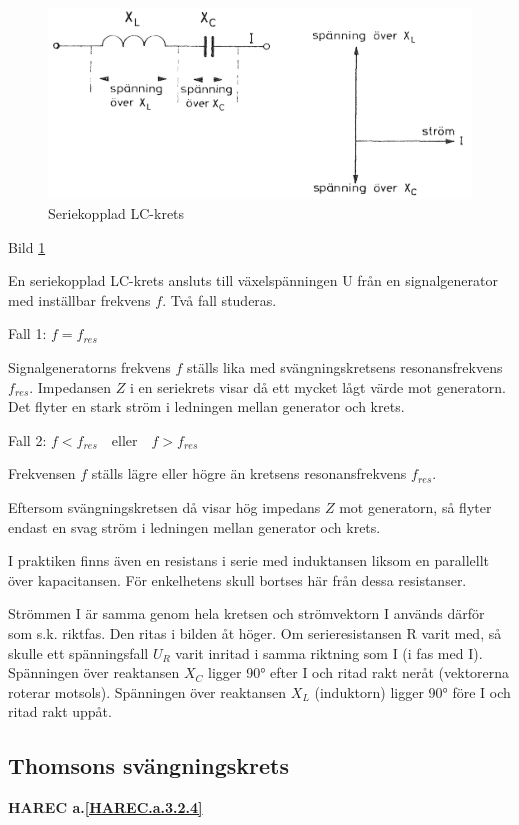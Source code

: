 \begin{figure}
\includegraphics[width=\textwidth]{images/bild_2_3-16.png}
\caption{Seriekopplad LC-krets}
\label{fig:BildII3-16}
\end{figure}

Bild \ref{fig:BildII3-16}

En seriekopplad LC-krets ansluts till växelspänningen U från en signalgenerator
med inställbar frekvens \(f\). Två fall studeras.

Fall 1: \(f = f_{res}\)

Signalgeneratorns frekvens \(f\) ställs lika med svängningskretsens
resonansfrekvens \(f_{res}\). Impedansen \(Z\) i en seriekrets visar då ett
mycket lågt värde mot generatorn. Det flyter en stark ström i ledningen mellan
generator och krets.

Fall 2: \(f < f_{res} \quad \text{eller} \quad f > f_{res}\)

Frekvensen \(f\) ställs lägre eller högre än kretsens resonansfrekvens
\(f_{res}\).

Eftersom svängningskretsen då visar hög impedans \(Z\) mot generatorn, så
flyter endast en svag ström i ledningen mellan generator och krets.

I praktiken finns även en resistans i serie med induktansen liksom en
parallellt över kapacitansen. För enkelhetens skull bortses här från dessa
resistanser.

Strömmen I är samma genom hela kretsen och strömvektorn I används därför som
s.k. riktfas. Den ritas i bilden åt höger. Om serieresistansen R varit med, så
skulle ett spänningsfall \(U_R\) varit inritad i samma riktning som I
(i fas med I). Spänningen över reaktansen \(X_C\) ligger 90° efter I och ritad
rakt neråt (vektorerna roterar motsols). Spänningen över reaktansen \(X_L\)
(induktorn) ligger 90° före I och ritad rakt uppåt.

\subsection{Thomsons svängningskrets}
\textbf{HAREC a.\ref{HAREC.a.3.2.4}\label{myHAREC.a.3.2.4}}

